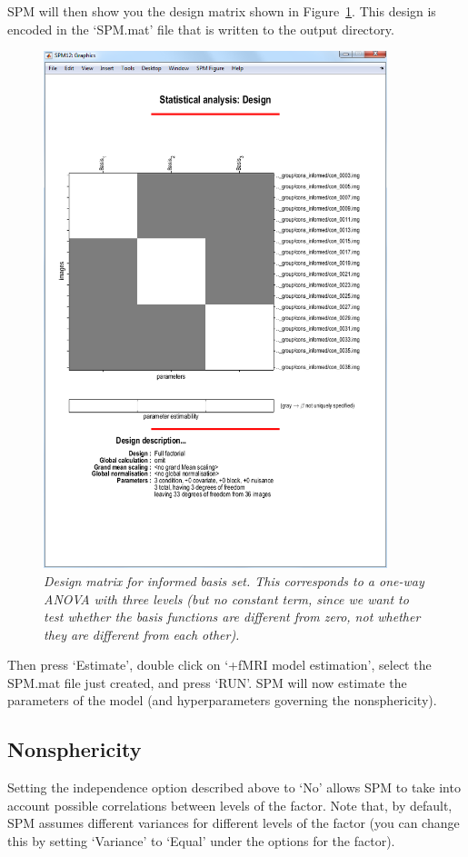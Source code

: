 \documentclass[a4paper,titlepage]{book}
\begin{document}
SPM will then show you the design matrix shown in Figure~\ref{informed_design}. This design is encoded in the `SPM.mat' file that is written to the output directory.
\begin{figure}
\begin{center}
\includegraphics[width=100mm]{faces_group/informed_design}
\caption{\em Design matrix for informed basis set. This corresponds to a one-way ANOVA with three levels (but no constant term, since we want to test whether the basis functions are different from zero, not whether they are different from each other). \label{informed_design}}
\end{center}
\end{figure}
Then press `Estimate', double click on `+fMRI model   estimation', select the SPM.mat file just created, and press `RUN'.
SPM will now estimate the parameters of the model (and hyperparameters governing the nonsphericity).

\subsection{Nonsphericity}

Setting the independence option described above to `No' allows SPM to take into account possible correlations between levels of the factor. Note that, by default, SPM assumes different variances 
for different levels of the factor (you can change this by setting `Variance' to `Equal' under the options for the factor). 
\end{document}
